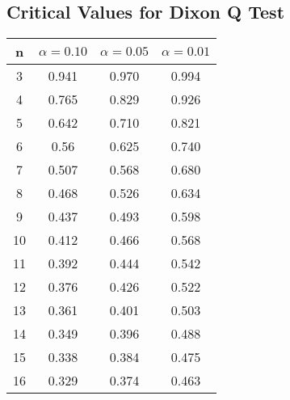 \documentclass[a4paper,12pt]{article}
\begin{document}
\subsection*{Critical Values for Dixon Q Test}
{
	\Large
	\begin{center}
	\begin{tabular}{|c|c|c|c|}
		\hline  n  & $\alpha=0.10$  & $\alpha=0.05$  & $\alpha=0.01$  \\ \hline
		3  & 0.941 & 0.970  & 0.994 \\ \hline
		4  & 0.765 & 0.829 & 0.926 \\ \hline
		5  & 0.642 & 0.710  & 0.821 \\ \hline
		6  & 0.56  & 0.625 & 0.740  \\ \hline
		7  & 0.507 & 0.568 & 0.680  \\ \hline
		8  & 0.468 & 0.526 & 0.634 \\ \hline
		9  & 0.437 & 0.493 & 0.598 \\ \hline
		10 & 0.412 & 0.466 & 0.568 \\ \hline
		11 & 0.392 & 0.444 & 0.542 \\ \hline
		12 & 0.376 & 0.426 & 0.522 \\ \hline
		13 & 0.361 & 0.401  & 0.503 \\ \hline
		14 & 0.349 & 0.396 & 0.488 \\ \hline
		15 & 0.338 & 0.384 & 0.475 \\ \hline
		16 & 0.329 & 0.374 & 0.463 \\ \hline
	\end{tabular} 
\end{center}
}
\end{document}

